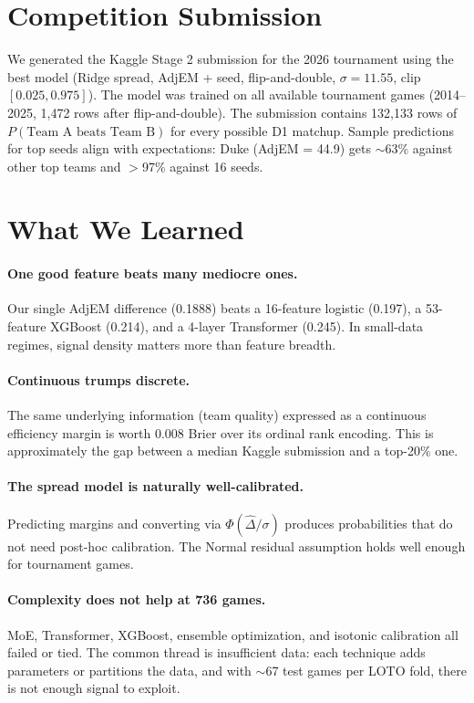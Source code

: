 \documentclass[11pt,a4paper]{article}
\begin{document}
\section{Competition Submission}

We generated the Kaggle Stage 2 submission for the 2026 tournament using the best model (Ridge spread, AdjEM + seed, flip-and-double, $\sigma = 11.55$, clip $[0.025, 0.975]$). The model was trained on all available tournament games (2014--2025, 1,472 rows after flip-and-double). The submission contains 132,133 rows of $P(\text{Team A beats Team B})$ for every possible D1 matchup. Sample predictions for top seeds align with expectations: Duke (AdjEM = 44.9) gets $\sim$63\% against other top teams and $>$97\% against 16 seeds.


\section{What We Learned}

\paragraph{One good feature beats many mediocre ones.} Our single AdjEM difference (0.1888) beats a 16-feature logistic (0.197), a 53-feature XGBoost (0.214), and a 4-layer Transformer (0.245). In small-data regimes, signal density matters more than feature breadth.

\paragraph{Continuous trumps discrete.} The same underlying information (team quality) expressed as a continuous efficiency margin is worth 0.008 Brier over its ordinal rank encoding. This is approximately the gap between a median Kaggle submission and a top-20\% one.

\paragraph{The spread model is naturally well-calibrated.} Predicting margins and converting via $\Phi(\hat{\Delta}/\sigma)$ produces probabilities that do not need post-hoc calibration. The Normal residual assumption holds well enough for tournament games.

\paragraph{Complexity does not help at 736 games.} MoE, Transformer, XGBoost, ensemble optimization, and isotonic calibration all failed or tied. The common thread is insufficient data: each technique adds parameters or partitions the data, and with $\sim$67 test games per LOTO fold, there is not enough signal to exploit.
\end{document}
